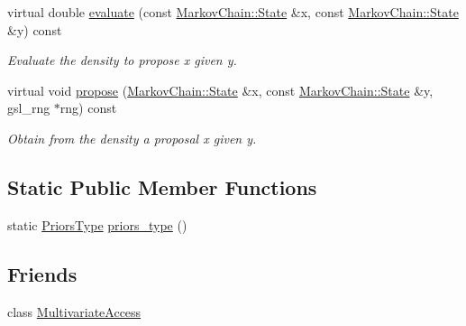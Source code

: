 \begin{DoxyCompactItemize}
virtual double \hyperlink{classeos_1_1proposal__functions_1_1BlockDecomposition_a2ccb90e87ccd98a155af6ecd71e03cf5}{evaluate} (const \hyperlink{structeos_1_1MarkovChain_1_1State}{MarkovChain::State} \&x, const \hyperlink{structeos_1_1MarkovChain_1_1State}{MarkovChain::State} \&y) const 
\begin{DoxyCompactList}\small\item\em Evaluate the density to propose x given y. \item\end{DoxyCompactList}\item 
virtual void \hyperlink{classeos_1_1proposal__functions_1_1BlockDecomposition_a5b0a6e997f1c78d2557f2a742c4d3813}{propose} (\hyperlink{structeos_1_1MarkovChain_1_1State}{MarkovChain::State} \&x, const \hyperlink{structeos_1_1MarkovChain_1_1State}{MarkovChain::State} \&y, gsl\_\-rng $\ast$rng) const 
\begin{DoxyCompactList}\small\item\em Obtain from the density a proposal x given y. \item\end{DoxyCompactList}\end{DoxyCompactItemize}
\subsection*{Static Public Member Functions}
\begin{DoxyCompactItemize}
\item 
static \hyperlink{classeos_1_1hdf5_1_1Composite}{PriorsType} \hyperlink{classeos_1_1proposal__functions_1_1BlockDecomposition_a1dc4342c37838cf8d87f5c64c2f02f66}{priors\_\-type} ()
\end{DoxyCompactItemize}
\subsection*{Friends}
\begin{DoxyCompactItemize}
\item 
class \hyperlink{classeos_1_1proposal__functions_1_1BlockDecomposition_a52a0d4a7b6284023493999008d416bfe}{MultivariateAccess}
\end{DoxyCompactItemize}


